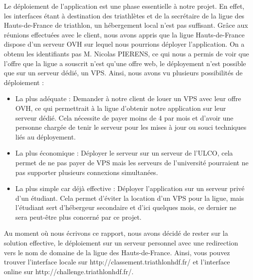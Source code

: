 Le déploiement de l'application est une phase essentielle à notre projet. En effet, les interfaces étant à destination des triathlètes et de la secrétaire de la ligue des Hauts-de-France de triathlon, un hébergement local n'est pas suffisant.\newline
Grâce aux réunions effectuées avec le client, nous avons appris que la ligue Hauts-de-France dispose d'un serveur OVH sur lequel nous pourrions déployer l'application. \newline
On a obtenu les identifiants pas M. Nicolas PIERENS, ce qui nous a permis de voir que l'offre que la ligue a souscrit n'est qu'une offre web, le déployement n'est possible que sur un serveur dédié, un VPS. Ainsi, nous avons vu plusieurs possibilités de déploiement : 
\begin{itemize}
	\item  La plus adéquate : Demander à notre client de louer un VPS avec leur offre OVH, ce qui permettrait à la ligue d'obtenir notre application sur leur serveur dédié. Cela nécessite de payer moins de 4\€ par mois et d'avoir une personne chargée de tenir le serveur pour les mises à jour ou souci techniques liés au déployement.
	\item La plus économique : Déployer le serveur sur un serveur de l'ULCO, cela permet de ne pas payer de VPS mais les serveurs de l'université pourraient ne pas supporter plusieurs connexions simultanées.
	\item La plus simple car déjà effective : Déployer l'application sur un serveur privé d'un étudiant. Cela permet d'éviter la location d'un VPS pour la ligue, mais l'étudiant sert d'hébergeur secondaire et d'ici quelques mois, ce dernier ne sera peut-être plus concerné par ce projet.
\end{itemize} 
Au moment où nous écrivons ce rapport, nous avons décidé de rester sur la solution effective, le déploiement sur un serveur personnel avec une redirection vers le nom de domaine de la ligue des Hauts-de-France. Ainsi, vous pouvez trouver l'interface locale sur http://classement.triathlonhdf.fr/ et l'interface online sur  http://challenge.triathlonhdf.fr/. 